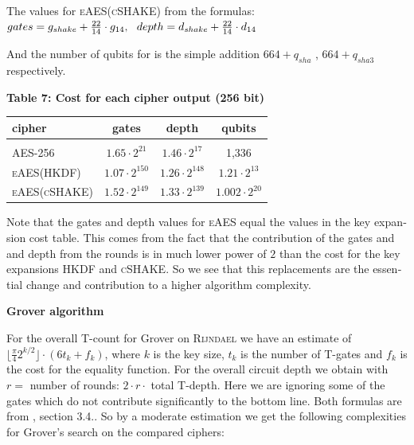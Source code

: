 \documentclass[a4paper,11pt]{article}
\begin{document}
\begin{otherlanguage}{english}
\noindent
The values for \textsc{eAES}(\textsc{cSHAKE}) from the formulas: \\
\vspace{0.5cm}
\noindent
$\small{gates} = g_{shake} + \frac{22}{14} \cdot g_{14}, \,\,$
$\small{depth} = d_{shake} + \frac{22}{14} \cdot d_{14}$

\noindent
And the number of qubits for is the simple addition $664 + q_{sha}$ , $664 + q_{sha3}$ respectively. \\

\begin{center}
\textbf{Table 7: Cost for each cipher output (256 bit)} \\
\vspace{0.2cm}
  \begin{tabular}{l|c|c|c}
  cipher &  gates & depth & qubits \\ 
  \hline
    &  &  & \\ [-8pt]
  \textsc{AES}-256 & $1.65 \cdot 2^{21}$  &  $1.46 \cdot 2^{17}$ & 1,336 \\
  \small{\textsc{eAES}(\tiny{\textsc{HKDF}})} & $1.07 \cdot 2^{150}$ & $1.26 \cdot 2^{148}$ & $1.21 \cdot 2^{13}$  \\  
  \small{\textsc{eAES}(\tiny{\textsc{cSHAKE}})} & $1.52 \cdot 2^{149}$ & $1.33 \cdot 2^{139}$ & $1.002 \cdot 2^{20}$  \\  
  \end{tabular} 
\end{center}

\noindent
Note that the gates and depth values for \textsc{eAES} equal the values in the key expansion cost table. This comes from the fact that the contribution of the gates and and depth from the rounds is in much lower power of $2$ than the cost for the key expansions \textsc{HKDF} and \textsc{cSHAKE}. So we see that this replacements are the essential change and contribution to a higher algorithm complexity. \\

\begin{center}
\textbf{Grover algorithm} \\
\end{center}

\noindent
For the overall T-count for Grover on \textsc{Rijndael} we have an estimate of $\lfloor \frac{\pi}{4} 2^{k/2}\rfloor \cdot (6 t_{k} + f_k)$, where $k$ is the key size, $t_k$ is the number of T-gates and $f_k$ is the cost for the equality function. For the overall circuit depth we obtain with $r=$ number of rounds: $2 \cdot r \cdot$ total T-depth. Here we are ignoring some of the gates which do not contribute significantly to the bottom line. Both formulas are from \cite{GRO}, section 3.4.. So by a moderate estimation we get the following complexities for Grover's search on the compared ciphers:\\ 


\end{otherlanguage}
\end{document}
